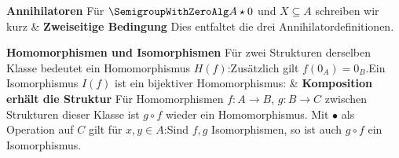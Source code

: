 \begin{BandUebersicht}
\textbf{Annihilatoren}
Für \(\SemigroupWithZeroAlg A\star0\) und \(X\subseteq A\)
schreiben wir kurz
&
\textbf{Zweiseitige Bedingung}
Dies entfaltet die drei Annihilatordefinitionen.
 \\
\addlinespace[.8ex]

\textbf{Homomorphismen und Isomorphismen}
Für zwei Strukturen derselben Klasse bedeutet ein Homomorphismus
\(H(f)\):Zusätzlich gilt \(f(0_A)=0_B\).Ein Isomorphismus \(I(f)\) ist ein bijektiver Homomorphismus:
&
\textbf{Komposition erhält die Struktur}
Für Homomorphismen \(f:A\to B\), \(g:B\to C\) zwischen
Strukturen dieser Klasse ist \(g\circ f\) wieder ein Homomorphismus.
Mit \(\bullet\) als Operation auf \(C\) gilt für \(x,y\in A\):Sind \(f,g\) Isomorphismen, so ist auch \(g\circ f\) ein Isomorphismus.
 \\
\addlinespace[.8ex]
\end{BandUebersicht}

